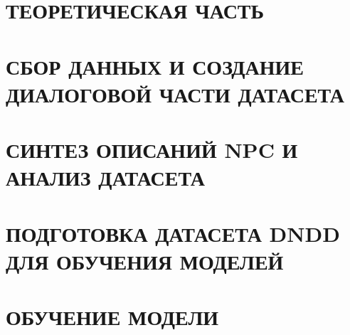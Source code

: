 \documentclass{thesis}
\begin{document}

\tableofcontents
\thispagestyle{empty}


\chapter{ТЕОРЕТИЧЕСКАЯ ЧАСТЬ}


\chapter{СБОР ДАННЫХ И СОЗДАНИЕ ДИАЛОГОВОЙ ЧАСТИ ДАТАСЕТА}


\chapter{СИНТЕЗ ОПИСАНИЙ NPC И АНАЛИЗ ДАТАСЕТА}


\chapter{ПОДГОТОВКА ДАТАСЕТА DNDD ДЛЯ ОБУЧЕНИЯ МОДЕЛЕЙ}


\chapter{ОБУЧЕНИЕ МОДЕЛИ}



\break



\appendix

\end{document}

